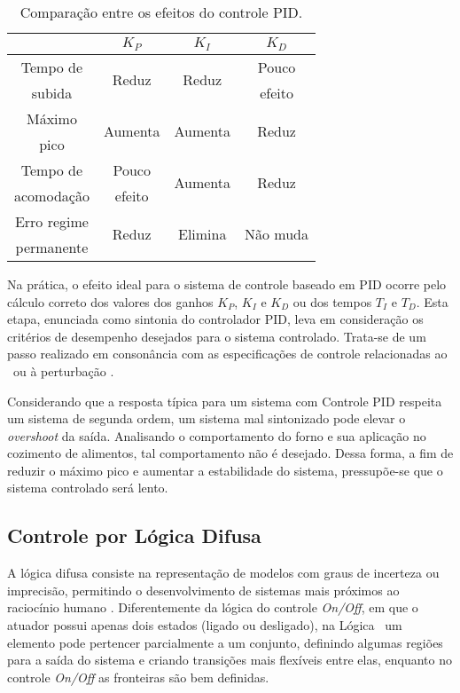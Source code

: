 \begin{table}[H]
    \centering  
    \caption{Comparação entre os efeitos do controle PID.} \label{EfeitosPID}
    \begin{tabular}{cccc} \cline{2-4}
         \rule{0mm}{4mm} & $K_P$ & $K_I$ & $K_D$ \\ \hline
         \rule{0mm}{4mm} Tempo de & \multirow{2}{*}{Reduz} & \multirow{2}{*}{Reduz} & Pouco \\
         subida &&& efeito \\ \hline
         \rule{0mm}{4mm} Máximo & \multirow{2}{*}{Aumenta} & \multirow{2}{*}{Aumenta} & \multirow{2}{*}{Reduz} \\
         pico &&& \\ \hline
         \rule{0mm}{4mm} Tempo de & Pouco & \multirow{2}{*}{Aumenta} & \multirow{2}{*}{Reduz} \\
         acomodação & efeito && \\ \hline
         \rule{0mm}{4mm} Erro regime & \multirow{2}{*}{Reduz} & \multirow{2}{*}{Elimina} & \multirow{2}{*}{Não muda} \\
         permanente &&& \\ \hline
    \end{tabular}
\end{table}

Na prática, o efeito ideal para o sistema de controle baseado em PID ocorre pelo cálculo correto dos valores dos ganhos $K_P$, $K_I$ e $K_D$ ou dos tempos $T_I$ e $T_D$. Esta etapa, enunciada como sintonia do controlador PID, leva em consideração os critérios de desempenho desejados para o sistema controlado. Trata-se de um passo realizado em consonância com as especificações de controle relacionadas ao \SetPoint \ ou à perturbação \cite{Sintonia_Visioli}.

Considerando que a resposta típica para um sistema com Controle PID respeita um sistema de segunda ordem, um sistema mal sintonizado pode elevar o \textit{overshoot} da saída. Analisando o comportamento do forno e sua aplicação no cozimento de alimentos, tal comportamento não é desejado. Dessa forma, a fim de reduzir o máximo pico e aumentar a estabilidade do sistema, pressupõe-se que o sistema controlado será lento.

\subsection{Controle por Lógica Difusa}
A lógica difusa consiste na representação de modelos com graus de incerteza ou imprecisão, permitindo o desenvolvimento de sistemas mais próximos ao raciocínio humano \cite{Resumo_Fuzzy}. Diferentemente da lógica do controle \textit{On/Off}, em que o atuador possui apenas dois estados (ligado ou desligado), na Lógica \Fuzzy \ um elemento pode pertencer parcialmente a um conjunto, definindo algumas regiões para a saída do sistema e criando transições mais flexíveis entre elas, enquanto no controle \textit{On/Off} as fronteiras são bem definidas.

